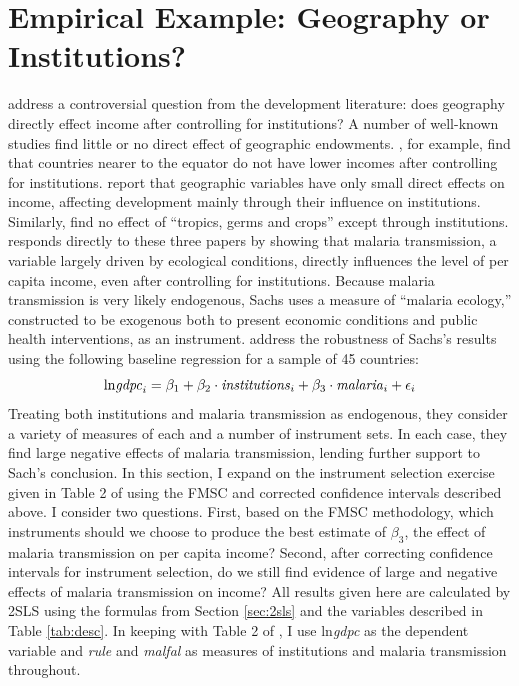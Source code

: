 \documentclass[12pt]{article}
\theoremstyle{definition}
\begin{document}
\section{Empirical Example: Geography or Institutions?}
\label{sec:application}
\cite{Carstensen2006} address a controversial question from the development literature: does geography directly effect income after controlling for institutions? A number of well-known studies find little or no direct effect of geographic endowments. \cite{Acemoglu}, for example, find that countries nearer to the equator do not have lower incomes after controlling for institutions. \cite{Rodrik} report that geographic variables have only small direct effects on income, affecting development mainly through their influence on institutions. Similarly, \cite{Easterly} find no effect of ``tropics, germs and crops'' except through institutions. \cite{Sachs} responds directly to these three papers by showing that malaria transmission, a variable largely driven by ecological conditions, directly influences the level of per capita income, even after controlling for institutions. Because malaria transmission  is very likely endogenous, Sachs uses a measure of ``malaria ecology,'' constructed to be exogenous both to present economic conditions and public health interventions, as an instrument. \cite{Carstensen2006} address the robustness of Sachs's results using the following baseline regression for a sample of 45 countries:
\begin{equation}
	\mbox{ln\emph{gdpc}}_i = \beta_1 + \beta_2 \cdot \mbox{\emph{institutions}}_i + \beta_3 \cdot \mbox{\emph{malaria}}_i + \epsilon_i
\end{equation}
Treating both institutions and malaria transmission as endogenous, they consider a variety of measures of each and a number of instrument sets. In each case, they find large negative effects of malaria transmission, lending further support to Sach's conclusion. In this section, I expand on the instrument selection exercise given in Table 2 of \cite{Carstensen2006} using the FMSC and corrected confidence intervals described above. I consider two questions. First, based on the FMSC methodology, which instruments should we choose to produce the best estimate of $\beta_3$, the effect of malaria transmission on per capita income? Second, after correcting confidence intervals for instrument selection, do we still find evidence of large and negative effects of malaria transmission on income? All results given here are calculated by 2SLS using the formulas from Section \ref{sec:2sls} and the variables described in Table \ref{tab:desc}. In keeping with Table 2 of \cite{Carstensen2006}, I use ln\emph{gdpc} as the dependent variable and \emph{rule} and \emph{malfal} as measures of institutions and malaria transmission throughout. 
\end{document}
